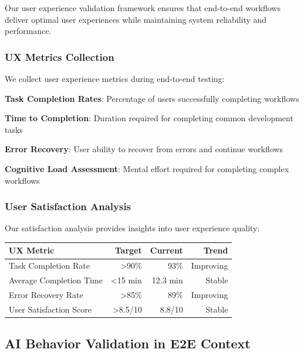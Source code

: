 Our user experience validation framework ensures that end-to-end workflows deliver optimal user experiences while maintaining system reliability and performance.

\subsubsection*{UX Metrics Collection}

We collect user experience metrics during end-to-end testing:

\begin{expandedlist}
    \item \textbf{Task Completion Rates}: Percentage of users successfully completing workflows
    \item \textbf{Time to Completion}: Duration required for completing common development tasks
    \item \textbf{Error Recovery}: User ability to recover from errors and continue workflows
    \item \textbf{Cognitive Load Assessment}: Mental effort required for completing complex workflows
\end{expandedlist}

\subsubsection*{User Satisfaction Analysis}

Our satisfaction analysis provides insights into user experience quality:

\begin{center}
\begin{tabular}{@{}lrrr@{}}
\toprule
\textbf{UX Metric} & \textbf{Target} & \textbf{Current} & \textbf{Trend} \\
\midrule
Task Completion Rate & >90\% & 93\% & Improving \\
Average Completion Time & <15 min & 12.3 min & Stable \\
Error Recovery Rate & >85\% & 89\% & Improving \\
User Satisfaction Score & >8.5/10 & 8.8/10 & Stable \\
\bottomrule
\end{tabular}
\end{center}

\subsection*{AI Behavior Validation in E2E Context}

